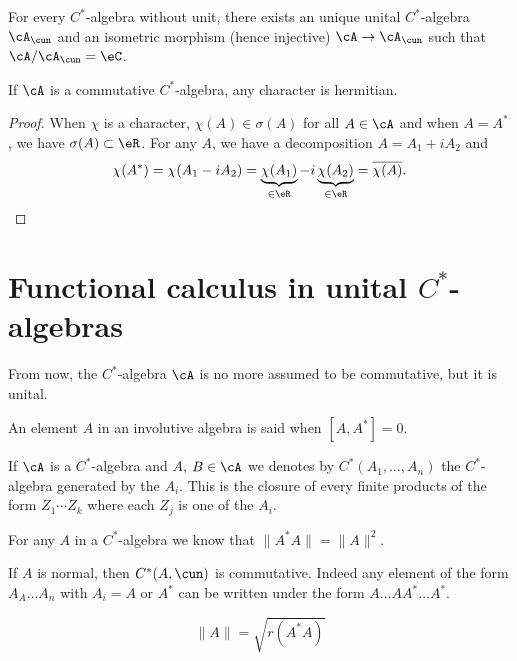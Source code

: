 \begin{proposition}
For every $C^*$-algebra without unit, there exists an unique unital $C^*$-algebra $\cA_{\cun}$ and an isometric morphism (hence injective) $\cA\to\cA_{\cun}$ such that $\cA/\cA_{\cun}=\eC$.
\label{prop_unitariz_csa}
\end{proposition}

\begin{proposition}
If $\cA$ is a commutative $C^*$-algebra, any character is hermitian.
\end{proposition}

\begin{proof}
When $\chi$ is a character, $\chi(A)\in\sigma(A)$ for all $A\in\cA$ and when $A=A^*$, we have $\sigma(A)\subset\eR$. For any $A$, we have a decomposition $A=A_1+iA_2$ and
\[ 
  \chi(A^*)=\chi(A_1-iA_2)=\underbrace{\chi(A_1)}_{\in\eR}-i\underbrace{\chi(A_2)}_{\in\eR}=\overline{ \chi(A) }.
\]

\end{proof}


\section{Functional calculus in unital \texorpdfstring{$C^*$}{C}-algebras}

From now, the $C^*$-algebra $\cA$ is no more assumed to be commutative, but it is unital. 

\begin{definition}      \label{DefElemNormal}
An element $A$ in an involutive algebra is said  when $[A,A^*]=0$.
\end{definition}

If $\cA$ is a $C^{*}$-algebra and $A$, $B\in\cA$ we denotes by $C^*(A_1,\ldots,A_n)$ the $C^{*}$-algebra generated by the $A_i$. This is the closure of every finite products of the form $Z_1\cdots Z_k$ where each $Z_j$ is one of the $A_i$.

For any $A$ in a $C^{*}$-algebra we know that $\|A^*A\|=\|A\|^2$.

If $A$ is normal, then $C^*(A,\cun)$ is commutative. Indeed any element of the form $A_A\ldots A_n$ with $A_i=A$ or $A^*$ can be written under the form $A\ldots AA^*\ldots A^*$.

\begin{proposition}
\begin{equation}\label{eq:ray_norme}
\|A\|=\sqrt{ r(A^*A) }
\end{equation}
\end{proposition}

